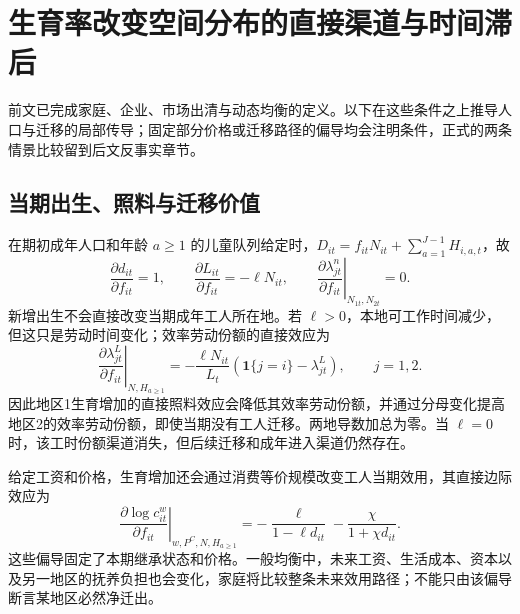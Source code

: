 \documentclass[UTF8,a4paper,zihao=-4,fontset=windows]{ctexart}
\numberwithin{equation}{section}
\newcommand{\pc}{P^{C}}
\begin{document}
\section{生育率改变空间分布的直接渠道与时间滞后}
\label{sec:fertility-spatial-transmission}

前文已完成家庭、企业、市场出清与动态均衡的定义。以下在这些条件之上推导人口与迁移的局部传导；固定部分价格或迁移路径的偏导均会注明条件，正式的两条情景比较留到后文反事实章节。


\subsection{当期出生、照料与迁移价值}
在期初成年人口和年龄 $a\geq1$ 的儿童队列给定时，$D_{it}=f_{it}N_{it}+\sum_{a=1}^{J-1}H_{i,a,t}$，故
\begin{equation}
 \frac{\partial d_{it}}{\partial f_{it}}=1,\qquad
 \frac{\partial L_{it}}{\partial f_{it}}=-\ell N_{it},\qquad
 \left.\frac{\partial\lambda^n_{jt}}{\partial f_{it}}\right|_{N_{1t},N_{2t}}=0.
 \label{eq:instantaneous-fertility-spatial-effect}
\end{equation}
新增出生不会直接改变当期成年工人所在地。若 $\ell>0$，本地可工作时间减少，但这只是劳动时间变化；效率劳动份额的直接效应为
\begin{equation}
 \left.\frac{\partial\lambda^L_{jt}}{\partial f_{it}}\right|_{N,H_{a\geq1}}
 =-\frac{\ell N_{it}}{L_t}
 \left(\mathbf1\{j=i\}-\lambda^L_{jt}\right),\qquad j=1,2.
 \label{eq:instantaneous-effective-share-effect}
\end{equation}
因此地区1生育增加的直接照料效应会降低其效率劳动份额，并通过分母变化提高地区2的效率劳动份额，即使当期没有工人迁移。两地导数加总为零。当 $\ell=0$ 时，该工时份额渠道消失，但后续迁移和成年进入渠道仍然存在。

给定工资和价格，生育增加还会通过消费等价规模改变工人当期效用，其直接边际效应为
\begin{equation}
 \left.\frac{\partial\log c^w_{it}}{\partial f_{it}}\right|_{w,\pc,N,H_{a\geq1}}
 =-\frac{\ell}{1-\ell d_{it}}-\frac{\chi}{1+\chi d_{it}}.
 \label{eq:fertility-consumption-direct-effect}
\end{equation}
这些偏导固定了本期继承状态和价格。一般均衡中，未来工资、生活成本、资本以及另一地区的抚养负担也会变化，家庭将比较整条未来效用路径；不能只由该偏导断言某地区必然净迁出。
\end{document}
